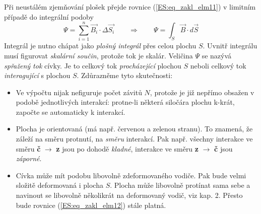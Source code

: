         Při neustálém zjemňování plošek přejde rovnice (\ref{ES:eq_zakl_elm11}) v limitním případě 
        do integrální podoby
        \begin{equation}\label{ES:eq_zakl_elm12}
          \Psi = \sum_{i=1}^n\vec{B_i}\cdot\Delta\vec{S_i} \qquad\Longrightarrow\qquad
          \Psi = \int_S\vec{B}\cdot d\vec{S}
        \end{equation}
        Integrál je nutno chápat jako \emph{plošný integrál} přes celou plochu \(S\). Uvnitř 
        integrálu musí figurovat \emph{skalární součin}, protože tok je skalár. Veličina \(\Psi\) 
        se nazývá \emph{spřažený tok} cívky. Je to celkový tok \emph{procházející} plochou \(S\) 
        neboli celkový tok \emph{interagující} s plochou \(S\). Zdůrazněme tyto skutečnosti:
        \begin{itemize}\addtolength{\itemsep}{-0.5\baselineskip}
          \item Ve výpočtu nijak nefiguruje počet závitů \(N\), protože je již nepřímo obsažen v 
                podobě jednotlivých interakcí: protne-li některá siločára plochu k-krát, započte se 
                automaticky k interakcí.
        
          \item Plocha je orientovaná (má např. červenou a zelenou stranu). To znamená, že záleží 
                na směru protnutí, na \emph{směru} interakcí. Pak např. všechny interakce ve směru 
                \textbf{č} \(\rightarrow\) \textbf{z} jsou po dohodě \emph{kladné}, interakce 
                ve směru \textbf{z} \(\rightarrow\) \textbf{č} jsou \emph{záporné}.
        
          \item Cívka může mít podobu libovolně zdeformovaného vodiče. Pak bude velmi složitě 
                deformovaná i plocha \(S\). Plocha může libovolně protínat sama sebe a navinout se 
                libovolně několikrát na deformovaný vodič, viz kap. 2. Přesto bude rovnice 
                (\ref{ES:eq_zakl_elm12}) stále platná.
      \end{itemize}
      
